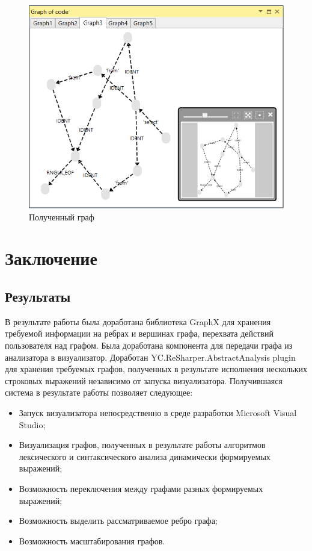 \documentclass{matmex-diploma}
\begin{document}
\begin{figure}[h]
\label{Hard}
\centering
\includegraphics[width=\textwidth]{StrongGraph.PNG}
\caption{Полученный граф}
\end{figure}

\newpage
\section*{Заключение}
\subsection*{Результаты}
В результате работы была доработана библиотека GraphX для хранения требуемой информации на ребрах и вершинах графа, перехвата действий пользователя над графом. Была доработана компонента для передачи графа из анализатора в визуализатор. Доработан YC.ReSharper.AbstractAnalysis plugin для хранения требуемых графов, полученных в результате исполнения нескольких строковых выражений независимо от запуска визуализатора. Получившаяся система в результате работы позволяет следующее:

\begin{itemize}

         \item { Запуск визуализатора непосредственно в среде разработки Microsoft Visual Studio;}
        \item { Визуализация графов, полученных в результате работы алгоритмов  лексического и синтаксического анализа динамически формируемых выражений;
}
       \item { Возможность переключения между графами разных формируемых выражений; }
       \item {Возможность выделить рассматриваемое ребро графа;}
       \item {Возможность масштабирования графов.}
\end{itemize}
\end{document}
